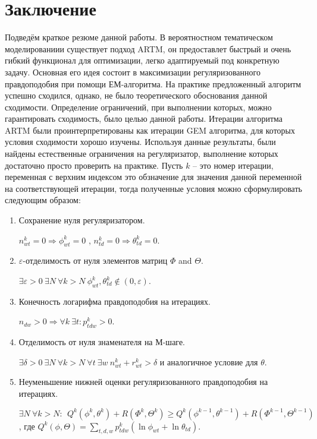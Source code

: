 \documentclass[12pt]{article}
\renewcommand{\geq}{\geqslant}
\begin{document}
\section{Заключение}
	Подведём краткое резюме данной работы. В вероятностном тематическом моделированиии существует подход ARTM, он предоставлет быстрый и очень гибкий функционал для оптимизации, легко адаптируемый под конкретную задачу. Основная его идея состоит в максимизации регуляризованного правдоподобия при помощи ЕМ-алгоритма. На практике предложенный алгоритм успешно сходился, однако, не было теоретического обоснования данной сходимости. Определение ограничений, при выполнении которых, можно гарантировать сходимость, было целью данной работы. Итерации алгоритма ARTM были проинтерпретированы как итерации GEM алгоритма, для которых условия сходимости хорошо изучены. Используя данные результаты, были найдены естественные ограничения на регуляризатор, выполнение которых достаточно просто проверить на практике. Пусть $k$ -- это номер итерации, переменная с  верхним индексом это обзначение для значения данной переменной на соответствующей итерации, тогда полученные условия можно сформулировать следующим образом:
\begin{enumerate}
\item Сохранение нуля регуляризатором.
\smallskip

$ n^k_{wt} = 0 \Rightarrow \phi^k_{wt} = 0$ , $n^k_{td} = 0 \Rightarrow \theta^k_{td} = 0$.
\item $\varepsilon$-отделимость от нуля элементов матриц $\Phi$ and $\Theta$.
\smallskip

$\exists \varepsilon>0\ \exists N\ \forall k > N\ \phi^k_{wt}, \theta^k_{td} \notin (0, \varepsilon)$. 
\item  Конечность логарифма правдоподобия на итерациях.
\smallskip

$ n_{dw}>0 \Rightarrow \forall k\ \exists t\colon p^k_{tdw} > 0$.
\item Отделимость от нуля знаменателя на М-шаге.
\smallskip

$\exists \delta >0\ \exists N\ \forall k > N \ \forall t\ \exists w\  n^k_{wt} + r^k_{wt} > \delta$ и аналогичное условие для $\theta$. 
\item Неуменьшение нижней оценки регуляризованного правдоподобия на итерациях.
\smallskip

$\exists N\ \forall k > N\colon\ \ Q^k (\phi^k, \theta^k)+ R(\Phi^k, \Theta^k) \geq Q^k(\phi^{k-1}, \theta^{k-1}) + R(\Phi^{k-1}, \Theta^{k-1})$, где $Q^k(\phi, \Theta) = \sum\limits_{t,d,w} p^k_{tdw} (\ln \phi_{wt} + \ln \theta_{td})$.
\end{enumerate}
\end{document}
